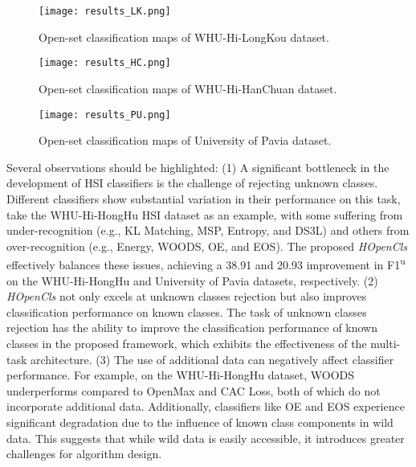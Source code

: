 \begin{figure*}[!t]
    \centering
    \texttt{[image: results\_LK.png]}
    \caption{Open-set classification maps of WHU-Hi-LongKou dataset.}
    \label{fig:result_LK}
\end{figure*}

\begin{figure*}[!t]
    \centering
    \texttt{[image: results\_HC.png]}
    \caption{Open-set classification maps of WHU-Hi-HanChuan dataset.}
    \label{fig:result_HC}
\end{figure*}



\begin{figure*}[!t]
    \centering
    \texttt{[image: results\_PU.png]}
    \caption{Open-set classification maps of University of Pavia dataset.}
    \label{fig:result_PU}
\end{figure*}

Several observations should be highlighted: (1) A significant bottleneck in the development of HSI classifiers is the challenge of rejecting unknown classes. Different classifiers show substantial variation in their performance on this task, take the WHU-Hi-HongHu HSI dataset as an example, with some suffering from under-recognition (e.g., KL Matching, MSP, Entropy, and DS3L) and others from over-recognition (e.g., Energy, WOODS, OE, and EOS). The proposed \textit{HOpenCls} effectively balances these issues, achieving a 38.91 and 20.93 improvement in F1\textsuperscript{u} on the WHU-Hi-HongHu and University of Pavia datasets, respectively. (2) \textit{HOpenCls} not only excels at unknown classes rejection but also improves classification performance on known classes. The task of unknown classes rejection has the ability to improve the classification performance of known classes in the proposed framework, which exhibits the effectiveness of the multi-task architecture. (3) The use of additional data can negatively affect classifier performance. For example, on the WHU-Hi-HongHu dataset, WOODS underperforms compared to OpenMax and CAC Loss, both of which do not incorporate additional data. Additionally, classifiers like OE and EOS experience significant degradation due to the influence of known class components in wild data. This suggests that while wild data is easily accessible, it introduces greater challenges for algorithm design.

